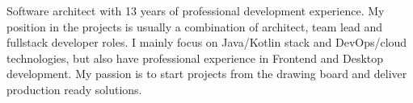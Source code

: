 

\begin{cvparagraph}

  Software architect with 13 years of professional development experience. My position in the projects is usually a combination of architect, team lead and fullstack developer roles. I mainly focus on Java/Kotlin stack and DevOps/cloud technologies, but also have professional experience in Frontend and Desktop development. My passion is to start projects from the drawing board and deliver production ready solutions.
\end{cvparagraph}